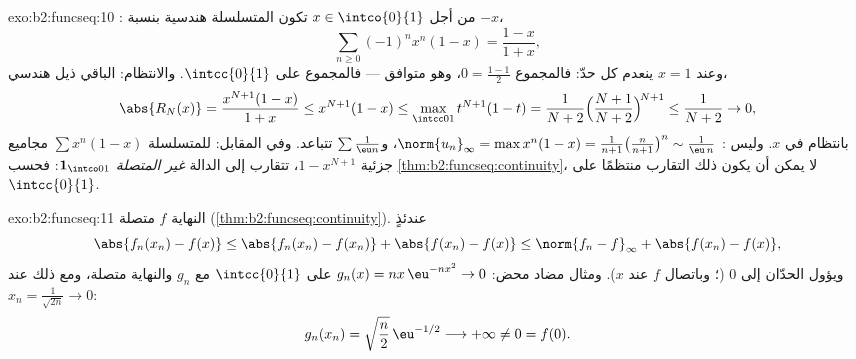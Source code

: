 \begin{solution}{exo:b2:funcseq:10}
: من أجل $x \in \intco{0}{1}$ تكون المتسلسلة هندسية بنسبة
$-x$،
\[
\sum_{n\geq0}(-1)^n x^n(1-x) = \frac{1-x}{1+x},
\]
وعند $x = 1$ ينعدم كل حدّ: فالمجموع $0 = \frac{1-1}{2}$،
وهو متوافق --- فالمجموع  على $\intcc{0}{1}$.
والانتظام: الباقي ذيل هندسي،
\[
\abs{R_N(x)} = \frac{x^{N+1}(1-x)}{1+x} \leq x^{N+1}(1 - x)
\leq \max_{\intcc01} t^{N+1}(1-t)
= \frac{1}{N+2}\Bigl(\frac{N+1}{N+2}\Bigr)^{\!N+1}
\leq \frac{1}{N+2} \to 0 ,
\]
بانتظام في $x$. وليس : $\norm{u_n}_\infty =
\max x^n(1-x) = \frac{1}{n+1}\bigl(\frac{n}{n+1}\bigr)^n \sim
\frac{1}{\eu\,n}$، و$\sum \frac1{\eu n}$ تتباعد. وفي المقابل:
للمتسلسلة $\sum x^n(1-x)$ مجاميع جزئية $1 - x^{N+1}$، تتقارب
 إلى الدالة \emph{غير المتصلة} $\mathbf 1_{\intco01}$: فحسب
\cref{thm:b2:funcseq:continuity}، لا يمكن أن يكون ذلك التقارب
منتظمًا على $\intcc{0}{1}$.
\end{solution}

\begin{solution}{exo:b2:funcseq:11}
النهاية $f$ متصلة (\cref{thm:b2:funcseq:continuity}).
عندئذٍ
\[
\abs{f_n(x_n) - f(x)}
\leq \abs{f_n(x_n) - f(x_n)} + \abs{f(x_n) - f(x)}
\leq \norm{f_n - f}_\infty + \abs{f(x_n) - f(x)} ,
\]
ويؤول الحدّان إلى $0$ (؛ وباتصال
$f$ عند $x$). ومثال مضاد  محض:
$g_n(x) = nx\,\eu^{-nx^2} \to 0$  على $\intcc{0}{1}$
مع $g_n$ والنهاية متصلة، ومع ذلك عند $x_n =
\frac{1}{\sqrt{2n}} \to 0$:
\[
g_n(x_n) = \sqrt{\frac n2}\,\eu^{-1/2} \longrightarrow +\infty
\neq 0 = f(0) .
\]
\end{solution}

